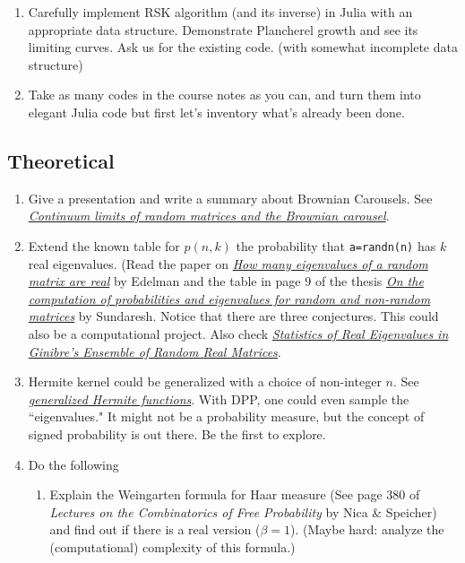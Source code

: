 \documentclass{article}
\begin{document}
\begin{enumerate}
    \item Carefully implement RSK algorithm (and its inverse) in Julia with an appropriate data structure. Demonstrate Plancherel growth and see its limiting curves. Ask us for the existing code. (with somewhat incomplete data structure)
    \item{Take as many codes in the course notes as you can, and turn them into elegant Julia code but first let's inventory what's already been done.}
\end{enumerate}
\subsection*{Theoretical}
\begin{enumerate}
    \item Give a presentation and write a summary about Brownian Carousels. See \href{https://arxiv.org/pdf/0712.2000.pdf}{\emph{\color{blue}Continuum limits of random matrices and the Brownian carousel}}. 
    \item Extend the known table for $p(n,k)$ the probability that \texttt{a=randn(n)} has $k$ real eigenvalues. (Read the paper on \href{http://www-math.mit.edu/~edelman/homepage/papers/howmany.pdf}{\emph{\color{blue}How many eigenvalues of a random matrix are real}} by Edelman and the table in page 9 of the thesis \href{http://dspace.mit.edu/bitstream/handle/1721.1/54840/587445752.pdf?sequence=1}{\emph{\color{blue}On the computation of probabilities and eigenvalues for random and non-random matrices}} by Sundaresh. Notice that there are three conjectures. This could also be a computational project. Also check \href{http://prl.aps.org/pdf/PRL/v95/i23/e230201}{\emph{\color{blue}Statistics of Real Eigenvalues in Ginibre’s Ensemble of Random Real Matrices}}.
    \item Hermite kernel could be generalized with a choice of non-integer $n$. See \href{https://functions.wolfram.com/HypergeometricFunctions/HermiteHGeneral/02/}{\emph{\color{blue}generalized Hermite functions}}. With DPP, one could even sample the ``eigenvalues." It might not be a probability measure, but the concept of signed probability is out there. Be the first to explore.
    \item Do the following
    \begin{enumerate}
        \item Explain the Weingarten formula for Haar measure (See page 380 of \emph{Lectures on the Combinatorics of Free Probability} by  Nica \& Speicher) and  find out if there is a real version ($\beta = 1$). (Maybe hard: analyze the (computational) complexity of this formula.)

\end{enumerate}
\end{enumerate}
\end{document}
